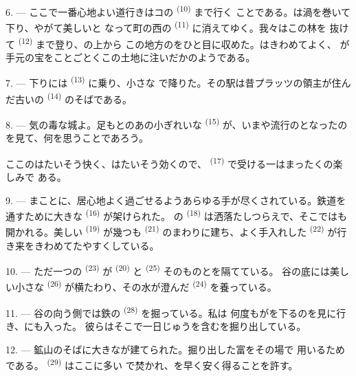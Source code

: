 6. --- ここで一番心地よい道行きはコの \textsuperscript{(10)} まで行く
ことである。は渦を巻いて下り、やがて美しいと
なって町の西の \textsuperscript{(11)} に消えてゆく。我々はこの林を
抜けて \textsuperscript{(12)} まで登り、の上から
この地方のをひと目に収めた。はきわめてよく、
が手元の宝をことごとくこの土地に注いだかのようである。

7. --- 下りには \textsuperscript{(13)} に乗り、小さな
で降りた。その駅は昔プラッツの領主が住んだ古いの
 \textsuperscript{(14)} のそばである。

8. --- 気の毒な城よ。足もとのあの小ぎれいな \textsuperscript{(15)}
が、いまや流行のとなったのを見て、何を思うことであろう。

ここのはたいそう快く、はたいそう効くので、
 \textsuperscript{(17)} で受ける一はまったくの楽しみで
ある。

\VUsaut{3.0mm}
\VUsaut{3.0mm}

9. --- まことに、居心地よく過ごせるようあらゆる手が尽くされている。鉄道を
通すために大きな \textsuperscript{(16)} が架けられた。
の \textsuperscript{(18)} は洒落たしつらえで、そこではも
開かれる。美しい \textsuperscript{(19)} が幾つも
\textsuperscript{(21)} のまわりに建ち、よく手入れした
\textsuperscript{(22)} が行き来をきわめてたやすくしている。

10. --- ただ一つの \textsuperscript{(23)} が
\textsuperscript{(20)} と \textsuperscript{(25)} そのものとを隔てている。
谷の底には美しい小さな \textsuperscript{(26)} が横たわり、その水が澄んだ
 \textsuperscript{(24)} を養っている。

11. --- 谷の向う側では鉄の \textsuperscript{(28)} を掘っている。私は
何度もがを下るのを見に行き、にも入った。
彼らはそこで一日じゅうを含むを掘り出している。

12. --- 鉱山のそばに大きなが建てられた。掘り出した富をその場で
用いるためである。 \textsuperscript{(29)} はここに多い
で焚かれ、を早く安く得ることを許す。

